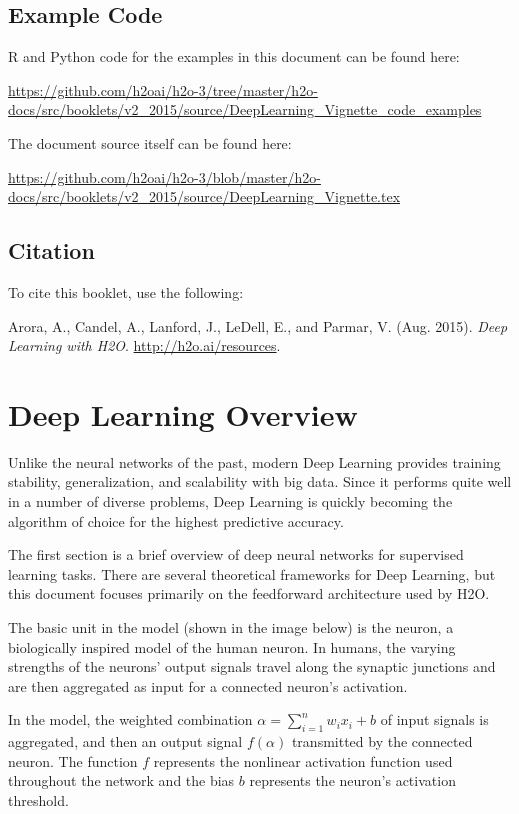 




\subsection{Example Code}

R and Python code for the examples in this document can be found here:

\url{https://github.com/h2oai/h2o-3/tree/master/h2o-docs/src/booklets/v2_2015/source/DeepLearning_Vignette_code_examples}

The document source itself can be found here:

\url{https://github.com/h2oai/h2o-3/blob/master/h2o-docs/src/booklets/v2_2015/source/DeepLearning_Vignette.tex}
\newpage
\subsection{Citation}

To cite this booklet, use the following: 

Arora, A., Candel, A., Lanford, J., LeDell, E., and Parmar, V. (Aug. 2015). {\textit{Deep Learning with H2O}}. {\url{http://h2o.ai/resources}}. 

\section{Deep Learning Overview}
Unlike the neural networks of the past, modern Deep Learning  provides training stability, generalization, and scalability with big data. Since it performs quite well in a number of diverse problems, Deep Learning is quickly becoming the algorithm of choice for the highest predictive accuracy. 

The first section is a brief overview of deep neural networks for supervised learning tasks. There are several theoretical frameworks for Deep Learning, but this document focuses primarily on the feedforward architecture used by H2O. 

The basic unit in the model (shown in the image below) is the neuron, a biologically inspired model of the human neuron. In humans, the varying strengths of the neurons' output signals travel along the synaptic junctions and are then aggregated  as input for a connected neuron's activation. 

In the model, the weighted combination $\alpha = \sum_{i=1}^{n} w_i x_i + b$ of input signals is aggregated, and then an output signal $f(\alpha)$ transmitted by the connected neuron. The function $f$ represents the nonlinear activation function used throughout the network and the bias $b$ represents the neuron's activation threshold.

